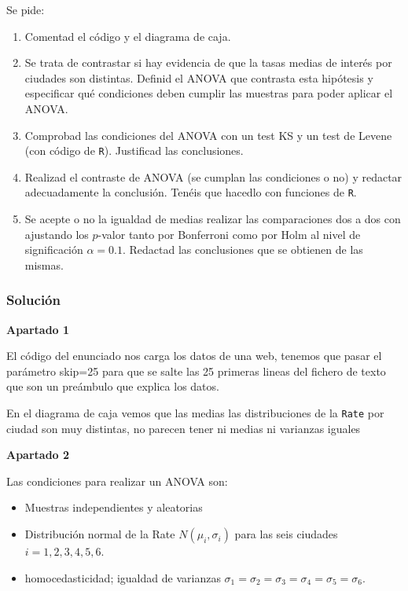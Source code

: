 \documentclass[
]{article}
\providecommand{\tightlist}{%
  \setlength{\itemsep}{0pt}\setlength{\parskip}{0pt}}
\begin{document}
Se pide:

\begin{enumerate}
\def\labelenumi{\arabic{enumi}.}
\tightlist
\item
  Comentad el código y el diagrama de caja.
\item
  Se trata de contrastar si hay evidencia de que la tasas medias de
  interés por ciudades son distintas. Definid el ANOVA que contrasta
  esta hipótesis y especificar qué condiciones deben cumplir las
  muestras para poder aplicar el ANOVA.\\
\item
  Comprobad las condiciones del ANOVA con un test KS y un test de Levene
  (con código de \texttt{R}). Justificad las conclusiones.\\
\item
  Realizad el contraste de ANOVA (se cumplan las condiciones o no) y
  redactar adecuadamente la conclusión. Tenéis que hacedlo con funciones
  de \texttt{R}.\\
\item
  Se acepte o no la igualdad de medias realizar las comparaciones dos a
  dos con ajustando los \(p\)-valor tanto por Bonferroni como por Holm
  al nivel de significación \(\alpha=0.1\). Redactad las conclusiones
  que se obtienen de las mismas.
\end{enumerate}

\hypertarget{soluciuxf3n-5}{%
\subsubsection{Solución}\label{soluciuxf3n-5}}

\textbf{Apartado 1}

El código del enunciado nos carga los datos de una web, tenemos que
pasar el parámetro skip=25 para que se salte las 25 primeras lineas del
fichero de texto que son un preámbulo que explica los datos.

En el diagrama de caja vemos que las medias las distribuciones de la
\texttt{Rate} por ciudad son muy distintas, no parecen tener ni medias
ni varianzas iguales

\textbf{Apartado 2}

Las condiciones para realizar un ANOVA son:

\begin{itemize}
\tightlist
\item
  Muestras independientes y aleatorias
\item
  Distribución normal de la Rate \(N(\mu_i,\sigma_i)\) para las seis
  ciudades \(i=1,2,3,4,5,6\).
\item
  homocedasticidad; igualdad de varianzas
  \(\sigma_1=\sigma_2=\sigma_3 =\sigma_4=\sigma_5=\sigma_6.\)
\end{itemize}
\end{document}
